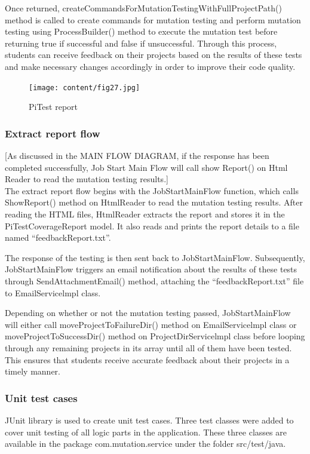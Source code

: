 Once returned, createCommandsForMutationTestingWithFullProjectPath() method is called to create commands for mutation testing and perform mutation testing using ProcessBuilder() method to execute the mutation test before returning true if successful and false if unsuccessful. Through this process, students can receive feedback on their projects based on the results of these tests and make necessary changes accordingly in order to improve their code quality.
\begin{figure}[h!]
	\centering
	\texttt{[image: content/fig27.jpg]}
	\caption{PiTest report}
	\label{fig:f11}
\end{figure}
\newpage
\subsubsection{Extract report flow}
  [As discussed in the MAIN FLOW DIAGRAM, if the response has been completed successfully, Job Start Main Flow will call show Report() on Html Reader to read the mutation testing results.] \\
The extract report flow begins with the JobStartMainFlow function, which calls ShowReport() method on HtmlReader to read the mutation testing results. After reading the HTML files, HtmlReader extracts the report and stores it in the PiTestCoverageReport model. It also reads and prints the report details to a file named “feedbackReport.txt”.\par
The response of the testing is then sent back to JobStartMainFlow. Subsequently, JobStartMainFlow triggers an email notification about the results of these tests through SendAttachmentEmail() method, attaching the “feedbackReport.txt” file to EmailServicelmpl class.\par 
Depending on whether or not the mutation testing passed, JobStartMainFlow will either call moveProjectToFailureDir() method on EmailServicelmpl class or moveProjectToSuccessDir() method on ProjectDirServicelmpl class before looping through any remaining projects in its array until all of them have been tested. This ensures that students receive accurate feedback about their projects in a timely manner.
\subsubsection{Unit test cases}
JUnit library is used to create unit test cases. Three test classes were added to cover unit testing of all logic parts in the application. These three classes are available in the package com.mutation.service under the folder src/test/java.
